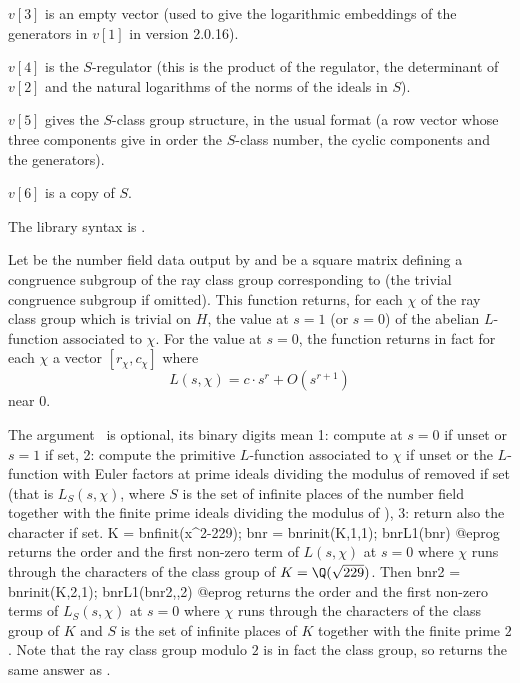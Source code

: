 $v[3]$ is an empty vector (used to give the logarithmic embeddings of the
generators in $v[1]$ in version 2.0.16).

$v[4]$ is the $S$-regulator (this is the product of the regulator, the
determinant of $v[2]$ and the natural logarithms of the norms of the ideals
in $S$).

$v[5]$ gives the $S$-class group structure, in the usual format
(a row vector whose three components give in order the $S$-class number,
the cyclic components and the generators).

$v[6]$ is a copy of $S$.

The library syntax is .

\label{se:bnrL1}
Let  be the number field data output by  and
 be a square matrix defining a congruence subgroup of the
ray class group corresponding to  (the trivial congruence subgroup
if omitted). This function returns, for each  $\chi$ of the ray
class group which is trivial on $H$, the value at $s = 1$ (or $s = 0$) of the
abelian $L$-function associated to $\chi$. For the value at $s = 0$, the
function returns in fact for each $\chi$ a vector $[r_\chi, c_\chi]$ where
$$L(s, \chi) = c \cdot s^r + O(s^{r + 1})$$
\noindent near $0$.

The argument \fl\ is optional, its binary digits
mean 1: compute at $s = 0$ if unset or $s = 1$ if set, 2: compute the
primitive $L$-function associated to $\chi$ if unset or the $L$-function
with Euler factors at prime ideals dividing the modulus of  removed
if set (that is $L_S(s, \chi)$, where $S$ is the
set of infinite places of the number field together with the finite prime
ideals dividing the modulus of ), 3: return also the character if
set.
\bprog
K = bnfinit(x^2-229);
bnr = bnrinit(K,1,1);
bnrL1(bnr)
@eprog\noindent
returns the order and the first non-zero term of $L(s, \chi)$ at $s = 0$
where $\chi$ runs through the characters of the class group of
$K = \Q(\sqrt{229})$. Then
\bprog
bnr2 = bnrinit(K,2,1);
bnrL1(bnr2,,2)
@eprog\noindent
returns the order and the first non-zero terms of $L_S(s, \chi)$ at $s = 0$
where $\chi$ runs through the characters of the class group of $K$ and $S$ is
the set of infinite places of $K$ together with the finite prime $2$. Note
that the ray class group modulo $2$ is in fact the class group, so
 returns the same answer as .

